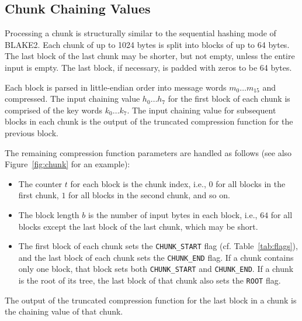 \documentclass[11pt,notitlepage,a4paper]{article}
\begin{document}
\subsection{Chunk Chaining Values}\label{sec:chunk}

Processing a chunk is structurally similar to the sequential hashing mode of BLAKE2. Each chunk of up to 1024 bytes is split into blocks of up to 64 bytes.
The last block of the last chunk may be shorter, but not empty, unless the
entire input is empty. The last block, if necessary, is padded with zeros to be 64
bytes. 

Each block is parsed in little-endian order into message words $m_{0}
\ldots m_{15}$ and compressed. The input chaining value $h_{0} \ldots h_{7}$
for the first block of each chunk is comprised of the key words $k_{0} \ldots k_{7}$. The
input chaining value for subsequent blocks in each chunk is the output of the truncated
compression function for the previous block. 

The remaining compression function parameters are handled as follows (see also Figure~\ref{fig:chunk} for an example):
\begin{itemize}
\item The counter $t$ for each block is the chunk index, i.e., $0$ for all
blocks in the first chunk, $1$ for all blocks in the second chunk, and so on.
\item The block length $b$ is the
number of input bytes in each block, i.e., $64$ for all blocks except the last block of
the last chunk, which may be short. 
\item The first block of each chunk sets the
\texttt{CHUNK\_START} flag (cf. Table~\ref{tab:flags}), and the last block of each chunk sets the
\texttt{CHUNK\_END} flag. If a chunk contains only one block, that block sets
both \texttt{CHUNK\_START} and \texttt{CHUNK\_END}. If a chunk is the root of
its tree, the last block of that chunk also sets the \texttt{ROOT} flag.
\end{itemize}

The output of the truncated compression function for the last block in a chunk
is the chaining value of that chunk.
\end{document}

